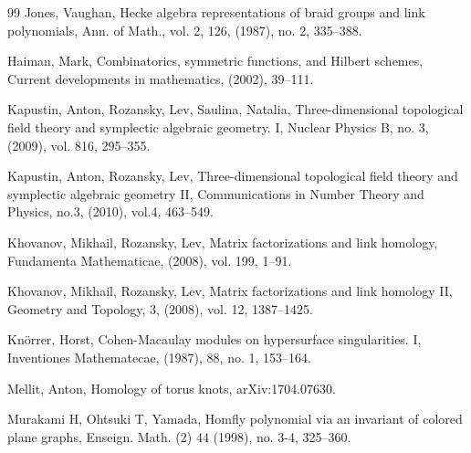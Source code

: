 \documentclass[10pt]{amsart}
\begin{document}
\begin{thebibliography}{99}
Jones, Vaughan,
Hecke algebra representations of braid groups and link polynomials,
Ann. of Math.,
vol. 2,
126,
(1987),
no. 2,
335--388.

Haiman, Mark,
Combinatorics, symmetric functions, and Hilbert schemes, Current developments in mathematics,
(2002), 39--111.

 Kapustin, Anton,
Rozansky, Lev,
Saulina, Natalia,
Three-dimensional topological field theory and symplectic algebraic geometry. I,
Nuclear Physics B,
no. 3,
(2009),
vol. 816,
295--355.

Kapustin, Anton,
Rozansky, Lev, Three-dimensional topological field theory and symplectic algebraic geometry II,
Communications in Number Theory and Physics,
no.3,
(2010),
vol.4,
463--549.






Khovanov, Mikhail,
Rozansky, Lev,
Matrix factorizations and link homology, Fundamenta Mathematicae,
(2008),
vol. 199,
1--91.

 Khovanov, Mikhail,
Rozansky, Lev,
Matrix factorizations and link homology II,
Geometry and Topology,
3,
(2008),
vol. 12,
1387--1425.



Kn\"orrer, Horst,
Cohen-Macaulay modules on hypersurface singularities. I,
Inventiones Mathematecae,
(1987),
88,
no. 1,
153--164.


 Mellit, Anton, Homology of torus knots, arXiv:1704.07630.


   Murakami H,  Ohtsuki T, Yamada, Homfly polynomial via an invariant of colored plane
graphs, Enseign. Math. (2) 44 (1998), no. 3-4, 325–360.



\end{thebibliography}
\end{document}
